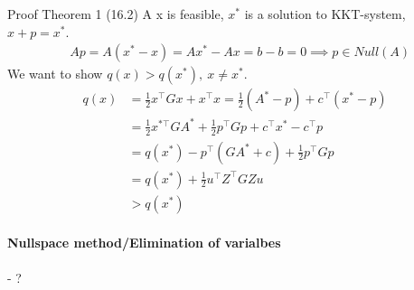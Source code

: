 \documentclass{article}
\begin{document}
\begin{proofbox}{Proof Theorem 1 (16.2)}
A x is feasible, $x^*$ is a solution to KKT-system, $x+p = x^*$. 
\begin{align*}
  &Ap = A(x^*-x)  = Ax^*-Ax = b - b = 0 \implies p\in Null(A)
\end{align*}
We want to show $q(x) > q(x^*),\  x \neq x^*$. 
\begin{align*}
  q(x) &= \frac{1}{2}x^{\top}Gx + x^{\top}x = \frac{1}{2}(A^*- p) + c^{\top}(x^*-p)  \\ 
  &= \frac{1}{2}x^{*\top}GA^* + \frac{1}{2}p^{\top}Gp + c^{\top}x^* - c^{\top}p  \\ 
  &= q(x^*) - p^{\top}(GA^*+c) + \frac{1}{2}p^{\top}Gp  \\ 
  &= q(x^*) + \frac{1}{2}u^{\top}Z^{\top}GZu  \\ 
  & > q(x^*)
\end{align*}
\end{proofbox}

\paragraph{Nullspace method/Elimination of varialbes}- ?
\end{document}
